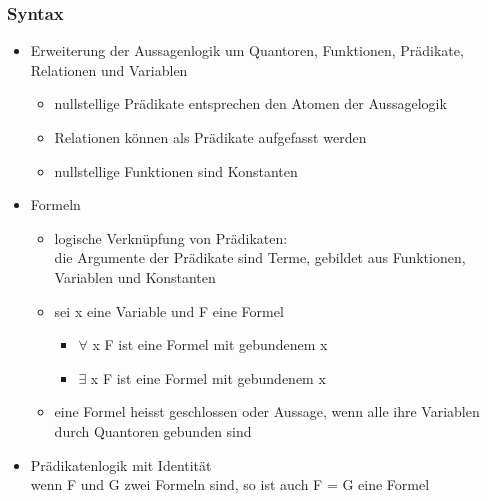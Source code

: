 \documentclass[a4paper,10pt]{article}
\begin{document}
\subsubsection{Syntax}
\begin{itemize}
	\item Erweiterung der Aussagenlogik um Quantoren, Funktionen, Pr\"adikate, Relationen und Variablen
		\begin{itemize}
			\item nullstellige Pr\"adikate entsprechen den Atomen der Aussagelogik
			\item Relationen k\"onnen als Pr\"adikate aufgefasst werden
			\item nullstellige Funktionen sind Konstanten
		\end{itemize}
	\item Formeln
		\begin{itemize}
			\item logische Verkn\"upfung von Pr\"adikaten: \\
				die Argumente der Pr\"adikate sind Terme, gebildet aus Funktionen, Variablen und Konstanten
			\item sei x eine Variable und F eine Formel
				\begin{itemize}
					\item $\forall$ x F ist eine Formel mit gebundenem x
					\item $\exists$ x F ist eine Formel mit gebundenem x
				\end{itemize}
			\item eine Formel heisst geschlossen oder Aussage, wenn alle ihre Variablen durch Quantoren gebunden sind
		\end{itemize}
	\item Pr\"adikatenlogik mit Identit\"at \\
		wenn F und G zwei Formeln sind, so ist auch F = G eine Formel
\end{itemize}
\end{document}

